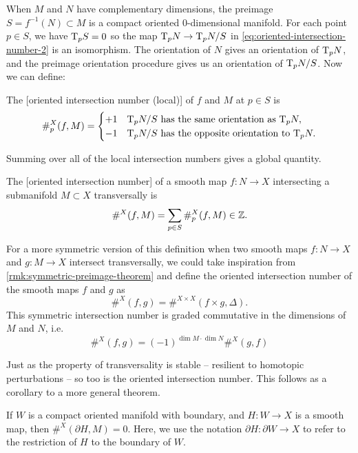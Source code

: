 When $M$ and $N$ have complementary dimensions, the preimage $S=f^{-1}(N)\subset M$ is a compact oriented $0$-dimensional manifold. For each point $p\in S$, we have $\mathrm{T}_p S=0$ so the map $\mathrm{T}_p N\to \mathrm{T}_p N/S$ in \cref{eq:oriented-intersection-number-2} is an isomorphism. The orientation of $N$ gives an orientation of $\mathrm{T}_p N$, and the preimage orientation procedure gives us an orientation of $\mathrm{T}_p N/S$. Now we can define:

\begin{definition}
The [oriented intersection number (local)] of $f$ and $M$ at $p\in S$ is
\[
	\#_p^X(f, M) = \begin{cases}
		+1 & \mathrm{T}_p N/S \textrm{ has the same orientation as } \mathrm{T}_p N,     \\
		-1 & \mathrm{T}_p N/S \textrm{ has the opposite orientation to } \mathrm{T}_p N.
	\end{cases}
\]
\end{definition}
Summing over all of the local intersection numbers gives a global quantity.
\begin{definition}
	The [oriented intersection number] of a smooth map $f : N \to X$ intersecting a submanifold $M\subset X$ transversally is
	\[
		\#^X(f, M) = \sum_{p\in S} \#_p^X(f, M) \in \mathbb{Z}.
	\]
\end{definition}

\begin{remark}\label{rmk:symmetric-intersection-number}
	For a more symmetric version of this definition when two smooth maps $f : N \to X$ and $g : M \to X$ intersect transversally, we could take inspiration from \cref{rmk:symmetric-preimage-theorem} and define the oriented intersection number of the smooth maps $f$ and $g$ as
	\[
		\#^X(f,g) = \#^{X\times X}(f\times g, \Delta).
	\]
	This symmetric intersection number is graded commutative in the dimensions of $M$ and $N$, i.e.
	\begin{equation}\label{eq:intersection-number-graded-commutative}
		\#^X(f,g) = (-1)^{\dim M\cdot \dim N} \#^X(g,f)
	\end{equation}
\end{remark}

Just as the property of transversality is stable -- resilient to homotopic perturbations -- so too is the oriented intersection number. This follows as a corollary to a more general theorem.

\begin{theorem}
	If $W$ is a compact oriented manifold with boundary, and $H : W \to X$ is a smooth map, then $\#^X(\partial H, M)=0$. Here, we use the notation $\partial H : \partial W \to X$ to refer to the restriction of $H$ to the boundary of $W$.
\end{theorem}


